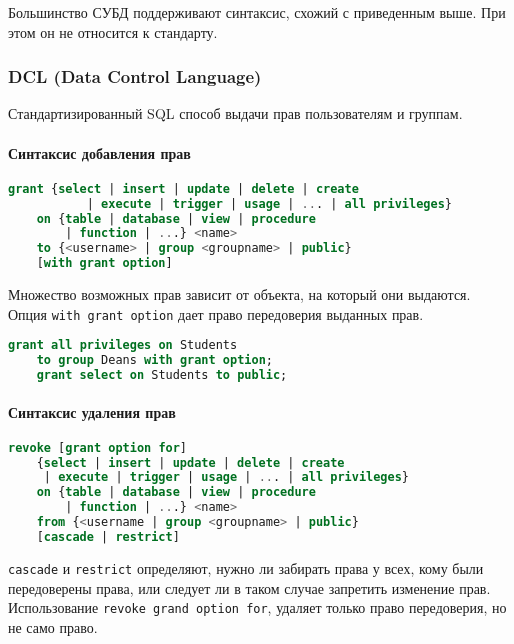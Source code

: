 \begin{remark}
	Большинство СУБД поддерживают синтаксис, схожий с приведенным выше. При этом он не относится к
	стандарту.
\end{remark}

\subsubsection{DCL (Data Control Language)}

Стандартизированный SQL способ выдачи прав пользователям и группам.

\paragraph{Синтаксис добавления прав}
\enewline

\begin{lstlisting}[language=SQL]
    grant {select | insert | update | delete | create
           | execute | trigger | usage | ... | all privileges}
    on {table | database | view | procedure
        | function | ...} <name>
    to {<username> | group <groupname> | public}
    [with grant option]
\end{lstlisting}

Множество возможных прав зависит от объекта, на который они выдаются. Опция \texttt{with grant option}
дает право передоверия выданных прав.

\begin{examples}
	\enewline
	\begin{lstlisting}[language=SQL]
    grant all privileges on Students
    to group Deans with grant option;
    grant select on Students to public;
    \end{lstlisting}
\end{examples}

\paragraph{Синтаксис удаления прав}
\enewline

\begin{lstlisting}[language=SQL]
    revoke [grant option for]
    {select | insert | update | delete | create
     | execute | trigger | usage | ... | all privileges}
    on {table | database | view | procedure
        | function | ...} <name>
    from {<username | group <groupname> | public}
    [cascade | restrict]
\end{lstlisting}

\texttt{cascade} и \texttt{restrict} определяют, нужно ли забирать права у всех, кому
были передоверены права, или следует ли в таком случае запретить изменение прав. Использование
\texttt{revoke grand option for}, удаляет только право передоверия, но не само право.

